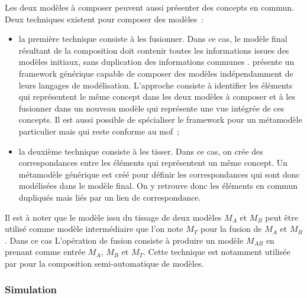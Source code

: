 Les deux modèles à composer peuvent aussi présenter des concepts en commun. Deux 
techniques existent pour composer des modèles~:

\begin{itemize}
\item la première technique consiste à les fusionner. Dans ce cas, le modèle 
final résultant de la composition doit contenir toutes les informations issues 
des modèles initiaux, sans duplication des informations communes 
\cite{bezivin2006canonical}.
\cite{fleurey2008generic} présente un framework générique capable de composer 
des modèles indépendamment de leurs langages de modélisation. L'approche 
consiste à identifier les éléments qui représentent le même concept dans les 
deux modèles à composer et à les fusionner dans un nouveau modèle qui représente 
une vue intégrée de ces concepts. Il est aussi possible de spécialiser le 
framework pour un métamodèle particulier mais qui reste conforme au \gls{mof}~;

\item la deuxième technique consiste à les tisser. Dans ce cas, on crée des 
correspondances entre les éléments qui représentent un même concept. Un 
métamodèle générique est créé pour définir les correspondances qui sont donc 
modélisées dans le modèle final. On y retrouve donc les éléments en commun 
dupliqués mais liés par un lien de correspondance. 
\end{itemize}

Il est à noter que le modèle issu du tissage de deux modèles $M_{A}$ et $M_{B}$ 
peut être utilisé comme modèle intermédiaire que l'on note $M_{T}$ pour la 
fusion de $M_{A}$ et $M_{B}$. Dans ce cas L'opération de fusion consiste à 
produire un modèle $M_{AB}$ en prenant comme entrée $M_{A}$, $M_{B}$ et $M_{T}$. 
Cette technique est notamment utilisée par \cite{del2007semi} pour la 
composition semi-automatique de modèles.


\subsubsection{Simulation}

